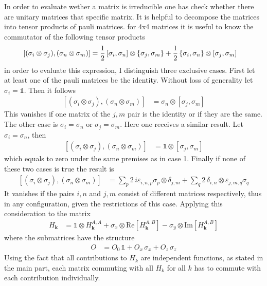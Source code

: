 In order to evaluate wether a matrix is irreducible one has check whether there are unitary matrices that specific matrix. It is helpful to decompose the matrices into tensor products of pauli matrices. for 4x4 matrices it is useful to know the commutator of the following tensor products
\begin{align*}
    \left[(\sigma_i\otimes\sigma_j), (\sigma_n\otimes\sigma_m)  \right]&= \frac{1}{2} \,[\sigma_i,\sigma_n]\otimes\{\sigma_j,\sigma_m\}+\frac{1}{2}\,\{\sigma_i,\sigma_n\}\otimes[\sigma_j,\sigma_m]
\end{align*}
in order to evaluate this expression, I distinguish three exclusive cases. First let at least one of the pauli matrices be the identity. Without loss of generality let $\sigma_i=\mathbb{1}$. Then it follows
\begin{align*}
    \left[(\sigma_i\otimes\sigma_j), (\sigma_n\otimes\sigma_m)  \right]&= \sigma_n\otimes[\sigma_j,\sigma_m]
\end{align*}
This vanishes if one matrix of the $j,m$ pair is the identity or if they are the same.
The other case is $\sigma_i=\sigma_n$ or $\sigma_j=\sigma_m$. Here one receives a similar result. Let $\sigma_i=\sigma_n$, then
\begin{align*}
    \left[(\sigma_i\otimes\sigma_j), (\sigma_n\otimes\sigma_m)  \right]&= \mathbb{1}\otimes[\sigma_j,\sigma_m]
\end{align*}
which equals to zero under the same premises as in case 1.
Finally if none of these two cases is true the result is
\begin{align*}
    \left[(\sigma_i\otimes\sigma_j), (\sigma_n\otimes\sigma_m)  \right]&= \sum_p2 \,i\varepsilon_{i,n,p}\sigma_p\otimes\delta_{j,m}+\sum_q2\,\delta_{i,n}\otimes\varepsilon_{j,m,q}\sigma_q
\end{align*}
It vanishes if the pairs $i,n$ and $j,m$ consist of different matrices respectively, thus in any configuration, given the restrictions of this case. Applying this consideration to the matrix
\begin{align}\label{eq:momentum Hamiltonian}
    H_\mathbf{k} &=\mathbb{1}\otimes H_\mathbf{k}^{A,A} + \sigma_x\otimes\text{Re}\left[ H_\mathbf{k}^{A,B} \right]-\sigma_y\otimes\text{Im}\left[ H_\mathbf{k}^{A,B} \right]
\end{align}
where the submatrices have the structure
\begin{align*}
    O &= O_0\,\mathbb{1}+ O_x\,\sigma_x+ O_z\,\sigma_z
\end{align*}
Using the fact that all contributions to $H_k$ are independent functions, as stated in the main part, each matrix commuting with all $H_k$ for all $k$ has to commute with each contribution individually.
